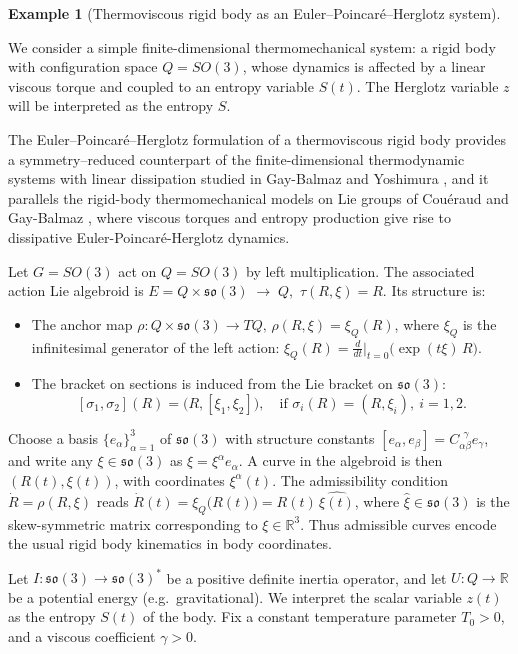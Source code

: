 \documentclass[11pt,a4paper]{article}
\theoremstyle{definition}
\newtheorem{example}[theorem]{Example}
\begin{document}
\begin{example}[Thermoviscous rigid body as an Euler--Poincar\'e--Herglotz system]
\label{ex:EPH-thermoviscous-rigid-body}

We consider a simple finite-dimensional thermomechanical system:
a rigid body with configuration space $Q = SO(3)$, whose dynamics is affected by a linear viscous torque and coupled to an
entropy variable $S(t)$. The Herglotz variable $z$ will be interpreted
as the entropy $S$.

The Euler–Poincaré–Herglotz formulation of a thermoviscous rigid body provides a symmetry–reduced counterpart of the finite-dimensional thermodynamic systems with linear dissipation studied in Gay-Balmaz and Yoshimura \cite{GayBalmazYoshimura2017PartI}, and it parallels the rigid-body thermomechanical models on Lie groups of Couéraud and Gay-Balmaz \cite{CoueraudGayBalmaz2020}, where viscous torques and entropy production give rise to dissipative Euler-Poincaré-Herglotz dynamics.

Let $G=SO(3)$ act on $Q=SO(3)$ by left multiplication.
The associated action Lie algebroid is $E = Q\times\mathfrak{so}(3) \;\to\; Q,
\,\, \tau(R,\xi) = R$. Its structure is:
\begin{itemize}
  \item The anchor map $\rho \colon Q\times\mathfrak{so}(3) \to TQ,\,
  \rho(R,\xi) = \xi_Q(R)$, where $\xi_Q$ is the infinitesimal generator of the left action:
  $\xi_Q(R) = \frac{d}{dt}\big|_{t=0} \big( \exp(t\xi)\,R\big)$.
  \item The bracket on sections is induced from the Lie bracket on
  $\mathfrak{so}(3)$:
  \[
  [\sigma_1,\sigma_2](R) = \big(R,[\xi_1,\xi_2]\big),
  \quad \text{if }\sigma_i(R)=(R,\xi_i),\ i=1,2.
  \]
\end{itemize}

Choose a basis $\{e_\alpha\}_{\alpha=1}^3$ of $\mathfrak{so}(3)$ with
structure constants $[e_\alpha,e_\beta] = C_{\alpha\beta}^{\ \ \gamma} e_\gamma$, and write any $\xi\in\mathfrak{so}(3)$ as $\xi=\xi^\alpha e_\alpha$.
A curve in the algebroid is then $(R(t),\xi(t))$, with coordinates
$\xi^\alpha(t)$. The admissibility condition $\dot R = \rho(R,\xi)$ reads $\dot R(t) = \xi_Q\big(R(t)\big)
           = R(t)\,\widehat{\xi(t)}$, where $\widehat{\xi}\in \mathfrak{so}(3)$ is the skew-symmetric matrix
corresponding to $\xi\in\mathbb{R}^3$. Thus admissible curves encode the
usual rigid body kinematics in body coordinates.


Let $I\colon \mathfrak{so}(3)\to\mathfrak{so}(3)^*$ be a positive definite
inertia operator, and let $U\colon Q\to\mathbb{R}$ be a potential energy
(e.g.\ gravitational). We interpret the scalar variable $z(t)$ as the
entropy $S(t)$ of the body. Fix a constant temperature parameter $T_0>0$,
and a viscous coefficient $\gamma>0$.


\end{example}
\end{document}
